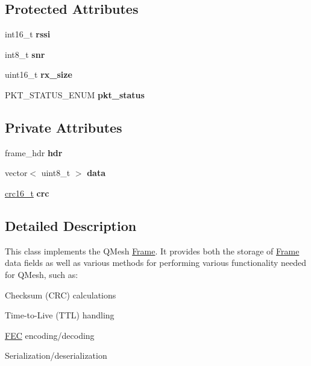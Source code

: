 \subsection*{Protected Attributes}
\begin{DoxyCompactItemize}
\item 
\mbox{\label{classFrame_ab7a6e2ca6c4b411ff1f2152ec1261539}} 
int16\+\_\+t {\bfseries rssi}
\item 
\mbox{\label{classFrame_a0bac5a6c745a0464b506884fe7ce4de4}} 
int8\+\_\+t {\bfseries snr}
\item 
\mbox{\label{classFrame_a4f9076d957cbace63b33dea31746f266}} 
uint16\+\_\+t {\bfseries rx\+\_\+size}
\item 
\mbox{\label{classFrame_adfe9288bf669e9ae08f61fa18b82c47f}} 
P\+K\+T\+\_\+\+S\+T\+A\+T\+U\+S\+\_\+\+E\+N\+UM {\bfseries pkt\+\_\+status}
\end{DoxyCompactItemize}
\subsection*{Private Attributes}
\begin{DoxyCompactItemize}
\item 
\mbox{\label{classFrame_ad08ba2f639e3c7d47cde39ecec16c4d3}} 
frame\+\_\+hdr {\bfseries hdr}
\item 
\mbox{\label{classFrame_a0af26264fb9334282af8ad0ab6253bf0}} 
vector$<$ uint8\+\_\+t $>$ {\bfseries data}
\item 
\mbox{\label{classFrame_aeb9531efc4880ad98cce77dd266e2f74}} 
\hyperlink{unionFrame_1_1crc16__t}{crc16\+\_\+t} {\bfseries crc}
\end{DoxyCompactItemize}


\subsection{Detailed Description}
This class implements the Q\+Mesh \hyperlink{classFrame}{Frame}. It provides both the storage of \hyperlink{classFrame}{Frame} data fields as well as various methods for performing various functionality needed for Q\+Mesh, such as\+:
\begin{DoxyItemize}
\item Checksum (C\+RC) calculations
\item Time-\/to-\/\+Live (T\+TL) handling
\item \hyperlink{classFEC}{F\+EC} encoding/decoding
\item Serialization/deserialization 
\end{DoxyItemize}


